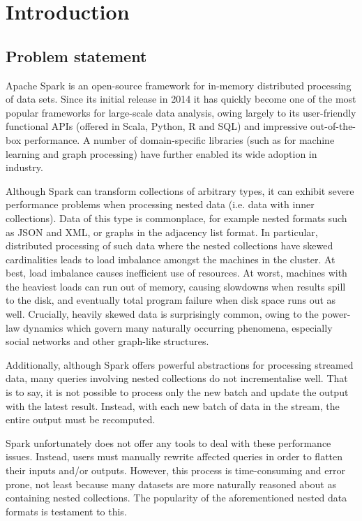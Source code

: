 \chapter{Introduction}

\section{Problem statement} {

Apache Spark \cite{spark} is an open-source framework for in-memory distributed processing of data sets. Since its initial release in 2014 it has quickly become one of the most popular frameworks for large-scale data analysis, owing largely to its user-friendly functional APIs (offered in Scala, Python, R and SQL) and impressive out-of-the-box performance. A number of domain-specific libraries (such as for machine learning and graph processing) have further enabled its wide adoption in industry.

Although Spark can transform collections of arbitrary types, it can exhibit severe performance problems when processing nested data (i.e. data with inner collections). Data of this type is commonplace, for example nested formats such as JSON and XML, or graphs in the adjacency list format. In particular, distributed processing of such data where the nested collections have skewed cardinalities leads to load imbalance amongst the machines in the cluster. At best, load imbalance causes inefficient use of resources. At worst, machines with the heaviest loads can run out of memory, causing slowdowns when results spill to the disk, and eventually total program failure when disk space runs out as well. Crucially, heavily skewed data is surprisingly common, owing to the power-law dynamics which govern many naturally occurring phenomena, especially social networks and other graph-like structures.

Additionally, although Spark offers powerful abstractions for processing streamed data, many queries involving nested collections do not incrementalise well. That is to say, it is not possible to process only the new batch and update the output with the latest result. Instead, with each new batch of data in the stream, the entire output must be recomputed.

Spark unfortunately does not offer any tools to deal with these performance issues. Instead, users must manually rewrite affected queries in order to flatten their inputs and/or outputs. However, this process is time-consuming and error prone, not least because many datasets are more naturally reasoned about as containing nested collections. The popularity of the aforementioned nested data formats is testament to this.

}

